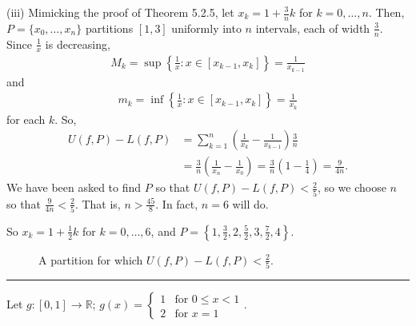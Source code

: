 \documentclass[letterpaper,10pt,english]{jupyterBook}
\let\sphinxpxdimen\pdfpxdimen\else\newdimen\sphinxpxdimen
\begin{document}
\sphinxAtStartPar
(iii) Mimicking the proof of Theorem 5.2.5, let \(x_k=1+\frac{3}{n}k\) for \(k=0,\ldots,n\). Then, \(P=\{x_0,\ldots,x_n\}\) partitions \([1,3]\) uniformly into \(n\) intervals, each of width \(\frac{3}{n}\). Since \(\frac{1}{x}\) is decreasing,
\begin{equation*}
\begin{split}
M_k = \sup\left\{\frac{1}{x}:x\in[x_{k-1},x_k]\right\} =\frac{1}{x_{k-1}}
\end{split}
\end{equation*}
\sphinxAtStartPar
and
\begin{equation*}
\begin{split}
m_k = \inf\left\{\frac{1}{x}:x\in[x_{k-1},x_k]\right\} =\frac{1}{x_k}
\end{split}
\end{equation*}
\sphinxAtStartPar
for each \(k\). So,
\begin{align*}
U(f,P) - L(f,P) &= \sum_{k=1}^n\left(\frac{1}{x_k} - \frac{1}{x_{k-1}}\right)\frac{3}{n} \\
&= \frac{3}{n}\left(\frac{1}{x_n}-\frac{1}{x_0}\right) = \frac{3}{n}\left(1-\frac{1}{4}\right) = \frac{9}{4n}.
\end{align*}
\sphinxAtStartPar
We have been asked to find \(P\) so that \(U(f,P)-L(f,P)<\frac{2}{5}\), so we choose \(n\) so that \(\frac{9}{4n}<\frac{2}{5}\). That is, \(n>\frac{45}{8}\). In fact, \(n=6\) will do.

\sphinxAtStartPar
So \(x_k=1+\frac{1}{2}k\) for \(k=0,\ldots,6\), and \(P=\left\{1,\frac{3}{2},2,\frac{5}{2},3,\frac{7}{2},4\right\}\).

\begin{figure}[htbp]
\centering
\capstart

\noindent\sphinxincludegraphics[width=600\sphinxpxdimen]{{int1iii}.png}
\caption{A partition for which \(U(f,P)-L(f,P)<\frac{2}{5}\).}\label{\detokenize{Solutions-full:q64iii}}\end{figure}


\bigskip\hrule\bigskip


\sphinxAtStartPar
{\hyperref[\detokenize{Problems:id67}]{}} Let \(g:[0,1]\to\mathbb{R}\); \(\displaystyle g(x)=\left\{\begin{array}{cc} 1 & \text{for } 0\leq x<1 \\ 2 &\text{for } x=1 \end{array}\right.\).
\end{document}
